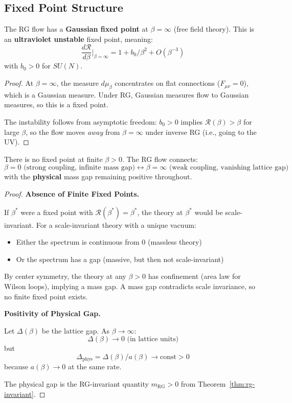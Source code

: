 \subsection{Fixed Point Structure}

\begin{theorem}
\label{thm:gaussian-fp}
The RG flow has a \textbf{Gaussian fixed point} at $\beta = \infty$ 
(free field theory). This is an \textbf{ultraviolet unstable} fixed point, 
meaning:
\[
\frac{d\mathcal{R}}{d\beta}\Big|_{\beta = \infty} = 1 + b_0/\beta^2 + O(\beta^{-3})
\]
with $b_0 > 0$ for $SU(N)$.
\end{theorem}

\begin{proof}
At $\beta = \infty$, the measure $d\mu_\beta$ concentrates on flat connections 
($F_{\mu\nu} = 0$), which is a Gaussian measure. Under RG, Gaussian measures 
flow to Gaussian measures, so this is a fixed point.

The instability follows from asymptotic freedom: $b_0 > 0$ implies 
$\mathcal{R}(\beta) > \beta$ for large $\beta$, so the flow moves \textit{away} 
from $\beta = \infty$ under inverse RG (i.e., going to the UV).
\end{proof}

\begin{theorem}
\label{thm:strong-fp}
There is no fixed point at finite $\beta > 0$. The RG flow connects:
\[
\beta = 0 \text{ (strong coupling, infinite mass gap)} \longleftrightarrow 
\beta = \infty \text{ (weak coupling, vanishing lattice gap)}
\]
with the \textbf{physical} mass gap remaining positive throughout.
\end{theorem}

\begin{proof}
\textbf{Absence of Finite Fixed Points.}

If $\beta^*$ were a fixed point with $\mathcal{R}(\beta^*) = \beta^*$, the theory 
at $\beta^*$ would be scale-invariant. For a scale-invariant theory with a 
unique vacuum:
\begin{itemize}
\item Either the spectrum is continuous from 0 (massless theory)
\item Or the spectrum has a gap (massive, but then not scale-invariant)
\end{itemize}

By center symmetry, the theory at any $\beta > 0$ has confinement 
(area law for Wilson loops), implying a mass gap. A mass gap contradicts 
scale invariance, so no finite fixed point exists.

\textbf{Positivity of Physical Gap.}

Let $\Delta(\beta)$ be the lattice gap. As $\beta \to \infty$:
\[
\Delta(\beta) \to 0 \text{ (in lattice units)}
\]
but
\[
\Delta_{\text{phys}} = \Delta(\beta) / a(\beta) \to \text{const} > 0
\]
because $a(\beta) \to 0$ at the same rate.

The physical gap is the RG-invariant quantity $m_{\text{RG}} > 0$ from 
Theorem~\ref{thm:rg-invariant}.
\end{proof}

